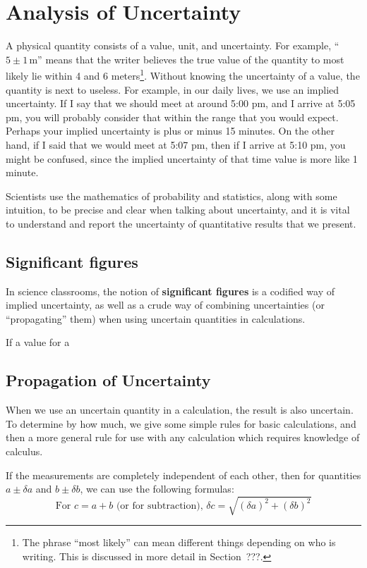 \chapter{Analysis of Uncertainty}

A physical quantity consists of a value, unit, and uncertainty. For example, ``$5 \pm 1\,$m'' means that the writer believes the true value of the quantity to most likely lie within 4 and 6 meters\footnote{The phrase ``most likely'' can mean different things depending on who is writing. This is discussed in more detail in Section\ ???.}. Without knowing the uncertainty of a value, the quantity is next to useless. For example, in our daily lives, we use an implied uncertainty. If I say that we should meet at around 5:00 pm, and I arrive at 5:05 pm, you will probably consider that within the range that you would expect. Perhaps your implied uncertainty is plus or minus 15 minutes. On the other hand, if I said that we would meet at 5:07 pm, then if I arrive at 5:10 pm, you might be confused, since the implied uncertainty of that time value is more like 1 minute.

Scientists use the mathematics of probability and statistics, along with some intuition, to be precise and clear when talking about uncertainty, and it is vital to understand and report the uncertainty of quantitative results that we present.

\section{Significant figures}

In science classrooms, the notion of \textbf{significant figures} is a codified way of implied uncertainty, as well as a crude way of combining uncertainties (or ``propagating'' them) when using uncertain quantities in calculations.

If a value for a 

\section{Propagation of Uncertainty}

When we use an uncertain quantity in a calculation, the result is also uncertain. To determine by how much, we give some simple rules for basic calculations, and then a more general rule for use with any calculation which requires knowledge of calculus.

If the measurements are completely independent of each other, then for quantities $a \pm \delta a$ and $b \pm \delta b$, we can use the following formulas:
\begin{equation}\label{unc:add}
\textrm{For } c = a + b \textrm{ (or for subtraction), } \delta c = \sqrt{(\delta a)^2 + (\delta b)^2}
\end{equation}

